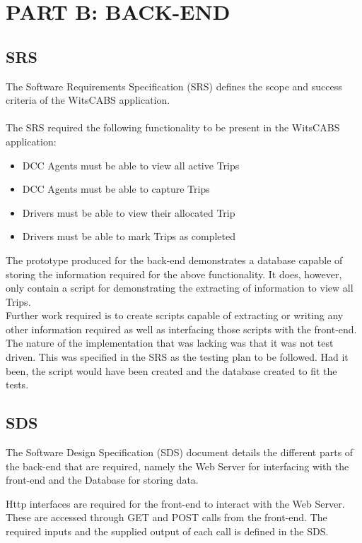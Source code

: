 \documentclass[12pt]{article}
\begin{document}
\newpage
\section{PART B: BACK-END}
\subsection{SRS}
The Software Requirements Specification (SRS) defines the scope and success criteria of the WitsCABS application. \\ \\

The SRS required the following functionality to be present in the WitsCABS application:
\begin{itemize}
\item DCC Agents must be able to view all active Trips
\item DCC Agents must be able to capture Trips
\item Drivers must be able to view their allocated Trip
\item Drivers must be able to mark Trips as completed
\end{itemize}

The prototype produced for the back-end demonstrates a database capable of storing the information required for the above functionality. It does, however, only contain a script for demonstrating the extracting of information to view all Trips. \\

Further work required is to create scripts capable of extracting or writing any other information required as well as interfacing those scripts with the front-end.\\

The nature of the implementation that was lacking was that it was not test driven. This was specified in the SRS as the testing plan to be followed. Had it been, the script would have been created and the database created to fit the tests.
\subsection{SDS}
The Software Design Specification (SDS) document details the different parts of the back-end that are required, namely the Web Server for interfacing with the front-end and the Database for storing data.

Http interfaces are required for the front-end to interact with the Web Server. These are accessed through GET and POST calls from the front-end. The required inputs and the supplied output of each call is defined in the SDS.
\end{document}

